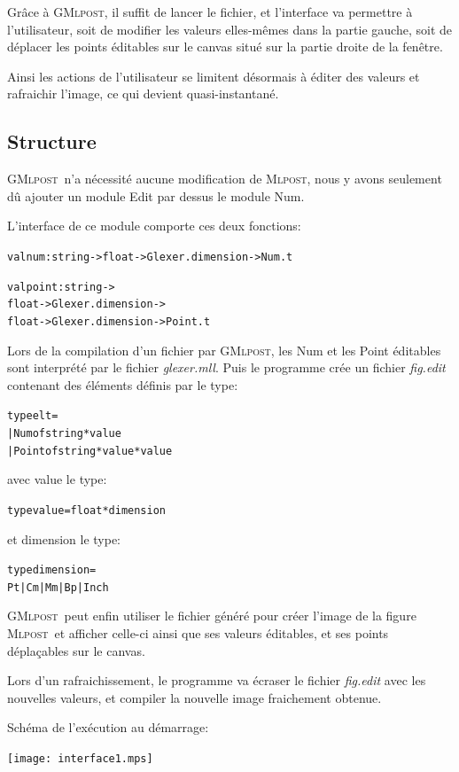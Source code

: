 \documentclass[a4paper,12pt]{article}
\newcommand{\mlpost}{\textsc{Mlpost}}
\newcommand{\gmlpost}{\textsc{GMlpost}}
\begin{document}
Grâce à \gmlpost, il suffit de lancer le fichier, et l'interface va permettre à l'utilisateur, soit de modifier les valeurs elles-mêmes dans la partie gauche, soit de déplacer les points éditables sur le canvas situé sur la partie droite de la fenêtre.

Ainsi les actions de l'utilisateur se limitent désormais à éditer des valeurs et rafraichir l'image, ce qui devient quasi-instantané.
\subsection{Structure}
\gmlpost\ n'a nécessité aucune modification de \mlpost, nous y avons seulement dû ajouter un module Edit par dessus le module Num.

L'interface de ce module comporte ces deux fonctions:
\begin{alltt}
  val num: string -> float -> Glexer.dimension -> Num.t

  val point: string -> 
  float -> Glexer.dimension -> 
  float -> Glexer.dimension -> Point.t
\end{alltt}

Lors de la compilation d'un fichier par \gmlpost, les Num et les Point éditables sont interprété par le fichier \textit{glexer.mll}. Puis le programme crée un fichier \textit{fig.edit} contenant des éléments définis par le type:
\begin{alltt}
  type elt = 
  | Num of string * value
  | Point of string * value * value
\end{alltt}
avec value le type:
\begin{alltt}
  type value = float * dimension
\end{alltt}
et dimension le type:
\begin{alltt}
  type dimension =
  Pt | Cm | Mm | Bp | Inch
\end{alltt}

\gmlpost\ peut enfin utiliser le fichier généré pour créer l'image de la figure \mlpost\ et afficher celle-ci ainsi que ses valeurs éditables, et ses points déplaçables sur le canvas.

Lors d'un rafraichissement, le programme va écraser le fichier \textit{fig.edit} avec les nouvelles valeurs, et compiler la nouvelle image fraichement obtenue.

\bigskip

Schéma de l'exécution au démarrage:
\begin{center}
\texttt{[image: interface1.mps]}
\end{center}
\end{document}
